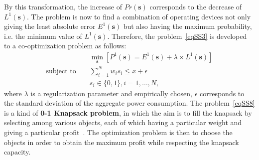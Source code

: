 By this transformation, the increase of $Pr(\mathbf{s})$ corresponds to the decrease of $L^1(\mathbf{s})$. The problem is now to find a combination of operating devices not only giving the least absolute error $E^1(\mathbf{s})$ but also having the maximum probability, i.e. the minimum value of $L^1(\mathbf{s})$. Therefore, the problem~\eqref{eqSS3} is developed to a co-optimization problem as follows:
\begin{eqnarray}\label{eqSS8}
& &\min_{\mathbf{s}}{\left[P^1(\mathbf{s}) = E^1(\mathbf{s}) + \lambda \times L^1(\mathbf{s})\right]}\\
\mbox{subject to } & & \sum_{i=1}^N{w_is_i} \leq x+\epsilon \nonumber \\
& &s_i\in \{0,1\}, i=1,\ldots ,N, \nonumber
\end{eqnarray}
where $\lambda$ is a regularization parameter and empirically chosen, $\epsilon$ corresponds to the standard deviation of the aggregate power consumption. The problem~\eqref{eqSS8} is a kind of \textbf{0-1 Knapsack problem}, in which the aim is to fill the knapsack by selecting among various objects, each of which having a particular weight and giving a particular profit~\cite{Lagoudakis96the0-1}. The optimization problem is then to choose the objects in order to obtain the maximum profit while respecting the knapsack capacity.




